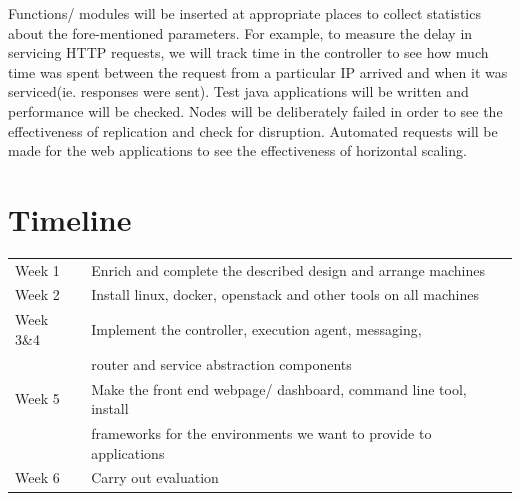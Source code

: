 \documentclass[a4paper]{article}
\begin{document}
  Functions/ modules will be inserted at appropriate places to collect statistics about the fore-mentioned parameters. For example, to measure the delay in servicing HTTP requests, we will track time in the controller to see how much time was spent between the request from a particular IP arrived and when it was serviced(ie. responses were sent). Test java applications will be written and performance will be checked. Nodes will be deliberately failed in order to see the effectiveness of replication and check for disruption. Automated requests will be made for the web applications to see the effectiveness of horizontal scaling.
  
  \setlength{\tabcolsep}{12pt}
  \section{Timeline}
  \begin{tabular}{ll}
  Week 1 & Enrich and complete the described design and arrange machines \\
  Week 2 & Install linux, docker, openstack and other tools on all machines \\
  Week 3\&4 & Implement the controller, execution agent, messaging,\\
  & router and service abstraction components \\
  Week 5 & Make the front end webpage/ dashboard, command line tool, install \\
  & frameworks for the environments we want to provide to applications \\
  Week 6 & Carry out evaluation \\
  \end{tabular} 
 
\end{document}
